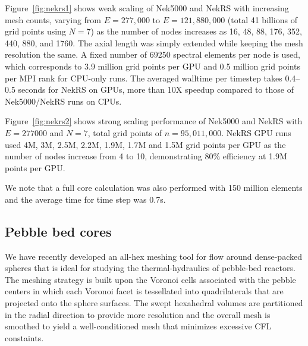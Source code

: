 \documentclass{anstrans}
\begin{document}
\medskip
Figure~\ref{fig:nekrs1} shows weak scaling of Nek5000 and NekRS with increasing mesh counts,
varying from $E = 277,000$ to $E = 121,880,000$ (total 41 billions of grid points using $N = 7$) 
as the number of nodes increases as 16, 48, 88, 176, 352, 440, 880, and 1760. 
The axial length was simply extended while keeping the mesh resolution the same. 
A fixed number of 69250 spectral elements per node is used, which corresponds 
to 3.9 million grid points per GPU and 0.5 million grid points per MPI rank for CPU-only runs.
The averaged walltime per timestep takes 0.4--0.5 seconds for NekRS on GPUs,
more than 10X speedup compared to those of Nek5000/NekRS runs on CPUs.

\medskip
Figure~\ref{fig:nekrs2} shows strong scaling performance of Nek5000 and NekRS with $E = 277000$ 
and $N = 7$, total grid points of $n = 95,011,000$. NekRS GPU runs used 
4M, 3M, 2.5M, 2.2M, 1.9M, 1.7M and 1.5M grid points per GPU as the number of nodes increase 
from 4 to 10, demonstrating 80\% efficiency at 1.9M points per GPU.

\medskip
We note that a full core calculation was also performed with 150 million elements and the average 
time for time step was 0.7s.



\subsection{Pebble bed cores}

We have recently developed an all-hex meshing tool for flow around
dense-packed spheres that is ideal for studying the thermal-hydraulics
of pebble-bed reactors.  The meshing strategy is built upon the Voronoi
cells associated with the pebble centers in which each Voronoi facet is
tessellated into quadrilaterals that are projected onto the sphere surfaces.
The swept hexahedral volumes are partitioned in the radial direction to
provide more resolution and the overall mesh is smoothed to yield a 
well-conditioned mesh that minimizes excessive CFL constaints.
\end{document}
